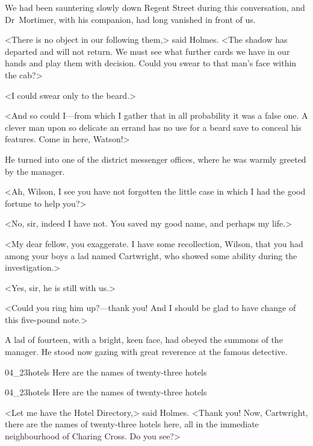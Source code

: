 We had been sauntering slowly down Regent Street during this conversation, and Dr~Mortimer, with his companion, had long vanished in front of us.

<There is no object in our following them,> said Holmes. <The shadow has departed and will not return. We must see what further cards we have in our hands and play them with decision. Could you swear to that man's face within the cab?>

<I could swear only to the beard.>

<And so could I—from which I gather that in all probability it was a false one. A clever man upon so delicate an errand has no use for a beard save to conceal his features. Come in here, Watson!>

He turned into one of the district messenger offices, where he was warmly greeted by the manager.

<Ah, Wilson, I see you have not forgotten the little case in which I had the good fortune to help you?>

<No, sir, indeed I have not. You saved my good name, and perhaps my life.>

<My dear fellow, you exaggerate. I have some recollection, Wilson, that you had among your boys a lad named Cartwright, who showed some ability during the investigation.>

<Yes, sir, he is still with us.>

<Could you ring him up?—thank you! And I should be glad to have change of this five-pound note.>

A lad of fourteen, with a bright, keen face, had obeyed the summons of the manager. He stood now gazing with great reverence at the famous detective.

\begin{letter}
	\begin{bwbigpic}
			[1.0]  
		{04_23hotels}
		{Here are the names of twenty-three hotels}
	\end{bwbigpic}
\end{letter}
\begin{a4}
	\begin{bwbigpic}
			[1.0]  
		{04_23hotels}
		{Here are the names of twenty-three hotels}
	\end{bwbigpic}
\end{a4}



<Let me have the Hotel Directory,> said Holmes. <Thank you! Now, Cartwright, there are the names of twenty-three hotels here, all in the immediate neighbourhood of Charing Cross. Do you see?>

